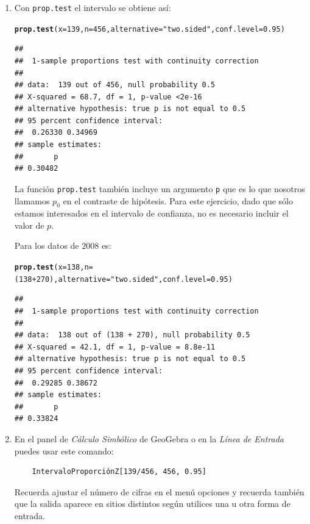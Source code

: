\documentclass[10pt,a4paper]{article}\usepackage[]{graphicx}\usepackage[]{color}
\makeatletter
\newcommand{\hlnum}[1]{\textcolor[rgb]{0.686,0.059,0.569}{#1}}%
\newcommand{\hlstr}[1]{\textcolor[rgb]{0.192,0.494,0.8}{#1}}%
\newcommand{\hlopt}[1]{\textcolor[rgb]{0,0,0}{#1}}%
\newcommand{\hlstd}[1]{\textcolor[rgb]{0.345,0.345,0.345}{#1}}%
\newcommand{\hlkwc}[1]{\textcolor[rgb]{0.333,0.667,0.333}{#1}}%
\newcommand{\hlkwd}[1]{\textcolor[rgb]{0.737,0.353,0.396}{\textbf{#1}}}%
\newenvironment{kframe}{%
 \def\at@end@of@kframe{}%
 \ifinner\ifhmode%
  \def\at@end@of@kframe{\end{minipage}}%
  \begin{minipage}{\columnwidth}%
 \fi\fi%
 \def\FrameCommand##1{\hskip\@totalleftmargin \hskip-\fboxsep
 \colorbox{shadecolor}{##1}\hskip-\fboxsep
     \hskip-\linewidth \hskip-\@totalleftmargin \hskip\columnwidth}%
 \MakeFramed {\advance\hsize-\width
   \@totalleftmargin\z@ \linewidth\hsize
   \@setminipage}}%
 {\par\unskip\endMakeFramed%
 \at@end@of@kframe}
\newenvironment{knitrout}{}{} %
\newcounter {cont01}
\makeatother
\begin{document}
\begin{enumerate}
  \item Con {\tt prop.test} el intervalo se obtiene así:
\begin{knitrout}
\color{fgcolor}\begin{kframe}
\begin{alltt}
  \hlkwd{prop.test}\hlstd{(}\hlkwc{x} \hlstd{=} \hlnum{139}\hlstd{,} \hlkwc{n} \hlstd{=} \hlnum{456}\hlstd{,} \hlkwc{alternative} \hlstd{=} \hlstr{"two.sided"}\hlstd{,} \hlkwc{conf.level} \hlstd{=} \hlnum{0.95}\hlstd{)}
\end{alltt}
\begin{verbatim}
## 
## 	1-sample proportions test with continuity correction
## 
## data:  139 out of 456, null probability 0.5
## X-squared = 68.7, df = 1, p-value <2e-16
## alternative hypothesis: true p is not equal to 0.5
## 95 percent confidence interval:
##  0.26330 0.34969
## sample estimates:
##       p 
## 0.30482
\end{verbatim}
\end{kframe}
\end{knitrout}
  La función {\tt prop.test} también incluye un argumento {\tt p} que es lo que nosotros llamamos $p_0$ en el contraste de hipótesis. Para este ejercicio, dado que sólo estamos interesados en el intervalo de confianza, no es necesario incluir el valor de $p$.

  Para los datos de $2008$ es:
\begin{knitrout}
\color{fgcolor}\begin{kframe}
\begin{alltt}
  \hlkwd{prop.test}\hlstd{(}\hlkwc{x} \hlstd{=} \hlnum{138}\hlstd{,} \hlkwc{n} \hlstd{= (}\hlnum{138} \hlopt{+} \hlnum{270}\hlstd{),} \hlkwc{alternative} \hlstd{=} \hlstr{"two.sided"}\hlstd{,} \hlkwc{conf.level} \hlstd{=} \hlnum{0.95}\hlstd{)}
\end{alltt}
\begin{verbatim}
## 
## 	1-sample proportions test with continuity correction
## 
## data:  138 out of (138 + 270), null probability 0.5
## X-squared = 42.1, df = 1, p-value = 8.8e-11
## alternative hypothesis: true p is not equal to 0.5
## 95 percent confidence interval:
##  0.29285 0.38672
## sample estimates:
##       p 
## 0.33824
\end{verbatim}
\end{kframe}
\end{knitrout}

  \item En el panel de {\em Cálculo Simbólico} de GeoGebra o en la {\em Línea de Entrada} puedes usar este comando:
  \begin{verbatim}
    IntervaloProporciónZ[139/456, 456, 0.95]
  \end{verbatim}
  Recuerda ajustar el número de cifras en el menú opciones y recuerda también que la salida aparece en sitios distintos según utilices una u otra forma de entrada.


\end{enumerate}
\end{document}
